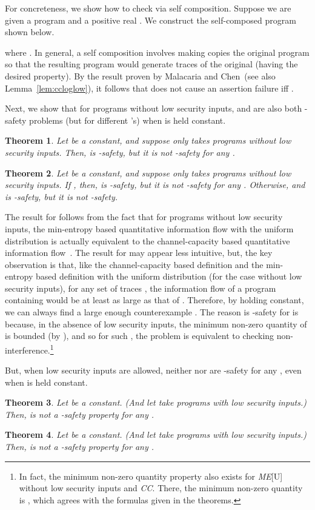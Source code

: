 \documentclass{llncs}
\newtheorem{theorem}{Theorem}[section]
\begin{document}
For concreteness, we show how to check  via self
composition.  Suppose we are given a program  and a positive real
.  We construct the self-composed program  shown below.

where .  In general, a self composition
involves making  copies the original program so that the resulting
program would generate  traces of the original (having the desired
property).  By the result proven by Malacaria and
Chen~\cite{malacaria08}(see also Lemma~\ref{lem:ccloglow}), it follows
that  does not cause an assertion failure iff .

Next, we show that for programs without low security inputs,  and  are also both -safety problems (but for
different 's) when  is held constant.
\begin{theorem}
\label{thm:mek}
Let  be a constant, and suppose  only takes programs
  without low security inputs.  Then,  is -safety, but it is not -safety for any .
\end{theorem}
\begin{theorem}
\label{thm:gek}
Let  be a constant, and suppose  only takes programs
without low security inputs.  If , then,  is -safety, but it is not -safety for any .  Otherwise,  and  is
-safety, but it is not -safety.
\end{theorem}

The result for  follows from the fact that for programs
without low security inputs, the min-entropy based quantitative
information flow with the uniform distribution is actually equivalent
to the channel-capacity based quantitative information
flow~\cite{smith09}.  The result for  may appear less
intuitive, but, the key observation is that, like the channel-capacity
based definition and the min-entropy based definition with the uniform
distribution (for the case without low security inputs), for any set
of traces , the information flow of a program
containing  would be at least as large as that of .  Therefore,
by holding  constant, we can always find a large enough
counterexample .  The reason  is -safety for
 is because, in the absence of low security inputs, the
minimum non-zero quantity of  is bounded (by ),
and so for such , the problem  is equivalent
to checking non-interference.\footnote{In fact, the minimum non-zero
  quantity property also exists for {\it ME}[U] without low security
  inputs and {\it CC}.  There, the minimum non-zero quantity is ,
  which agrees with the formulas given in the theorems.}

But, when low security inputs are allowed, neither  nor
 are -safety for any , even when  is held
constant.
\begin{theorem}
\label{thm:menk}
Let  be a constant.  (And let  take programs with
low security inputs.) Then,  is not a -safety
property for any .
\end{theorem}
\begin{theorem}
\label{thm:genk}
Let  be a constant.  (And let  take programs with
low security inputs.) Then,  is not a -safety
property for any .
\end{theorem}
\end{document}
